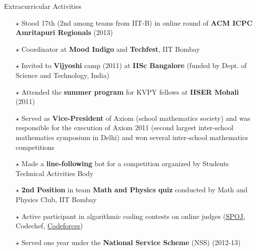 \documentclass{resume2} %
\begin{document}
\begin{rSection}{Extracurricular Activities}
\begin{itemize}[leftmargin=*]
\item[$\star$] Stood 17th (2nd among teams from IIT-B) in online round of \textbf{ACM ICPC Amritapuri Regionals} (2013)
\item[$\star$] Coordinator at \textbf{Mood Indigo} and \textbf{Techfest},  IIT Bombay
\item[$\star$] Invited to \textbf{Vijyoshi} camp (2011) at \textbf{IISc Bangalore} (funded by Dept. of Science and Technology, India)
\item[$\star$] Attended the \textbf{summer program} for KVPY fellows at \textbf{IISER Mohali} (2011)
\item[$\star$] Served as \textbf{Vice-President} of Axiom (school mathematics society) and was responsible for the execution of Axiom 2011 (second largest inter-school mathematics symposium in Delhi) and won several inter-school mathematics competitions
\item[$\star$] Made a \textbf{line-following} bot for a competition organized by Students Technical Activities Body
\item[$\star$] \textbf{2nd Position} in team \textbf{Math and Physics quiz} conducted by Math and Physics Club, IIT Bombay
\item[$\star$] Active participant in algorithmic coding contests on online judges (\href{http://spoj.com/users/pratyaksh}{SPOJ}, Codechef, \href{codeforces.com/profile/pratyaksh}{Codeforces})
\item[$\star$] Served one year under the \textbf{National Service Scheme} (NSS) (2012-13)
\end{itemize}
\end{rSection}
\end{document}
